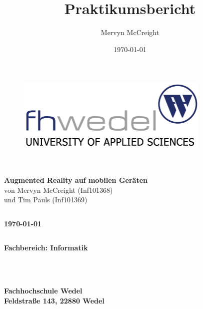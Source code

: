 \documentclass[a4paper, 12pt, hidelinks]{article}
\title{Praktikumsbericht}
\author{Mervyn McCreight}
\date{\today}
\begin{document}


\begin{figure}[h]
\centering
\includegraphics[width=350px]{fhwedel}
\label{fig:fhwedel}
\end{figure}




\begin{verbatim}


\end{verbatim}

\begin{center}
\textbf{\LARGE{Augmented Reality auf mobilen Geräten}}\\
von Mervyn McCreight (Inf101368)\\
und Tim Pauls (Inf101369)

\end{center}

\begin{verbatim}
\end{verbatim}

\begin{center}
\textbf{\today}
\end{center}

\begin{verbatim}
\end{verbatim}

\begin{center}
\textbf{\large{Fachbereich: Informatik}}
\end{center}

\begin{verbatim}

  
\end{verbatim}

\begin{center}
\textbf{\large{Fachhochschule Wedel}} \\
\textbf{\large{Feldstraße 143, 22880 Wedel}} \\
\end{center}
\end{document}
